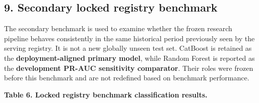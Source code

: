 \documentclass[
]{article}
\begin{document}
\subsection{9. Secondary locked registry
benchmark}\label{secondary-locked-registry-benchmark}

The secondary benchmark is used to examine whether the frozen research
pipeline behaves consistently in the same historical period previously
seen by the serving registry. It is not a new globally unseen test set.
CatBoost is retained as the \textbf{deployment-aligned primary model},
while Random Forest is reported as the \textbf{development PR-AUC
sensitivity comparator}. Their roles were frozen before this benchmark
and are not redefined based on benchmark performance.

\textbf{Table 6. Locked registry benchmark classification results.}
\end{document}
